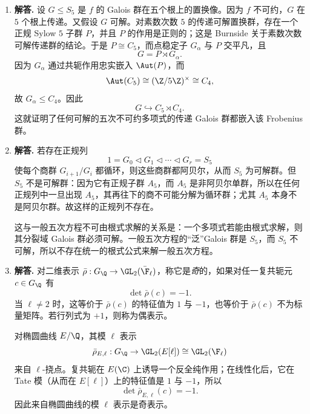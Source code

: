 \begin{enumerate}[label=\textbf{\arabic*.}, leftmargin=*, itemsep=1em]
\item \textbf{解答.} 设 $G\le S_5$ 是 $f$ 的 Galois 群在五个根上的置换像。因为 $f$ 不可约，$G$ 在 $5$ 个根上传递。又假设 $G$ 可解。对素数次数 $5$ 的传递可解置换群，存在一个正规 Sylow $5$ 子群 $P$，并且 $P$ 的作用是正则的；这是 Burnside 关于素数次数可解传递群的结论。于是 $P\cong C_5$，而点稳定子 $G_\alpha$ 与 $P$ 交平凡，且
\[
G=P\rtimes G_\alpha.
\]
因为 $G_\alpha$ 通过共轭作用忠实嵌入 $\Aut(P)$，而
\[
\Aut(C_5)\cong (\Z/5\Z)^\times\cong C_4,
\]
故 $G_\alpha\le C_4$。因此
\[
G\hookrightarrow C_5\rtimes C_4.
\]
这就证明了任何可解的五次不可约多项式的传递 Galois 群都嵌入该 Frobenius 群。

\item \textbf{解答.} 若存在正规列
\[
1=G_0\triangleleft G_1\triangleleft\cdots\triangleleft G_r=S_5
\]
使每个商群 $G_{i+1}/G_i$ 都循环，则这些商群都阿贝尔，从而 $S_5$ 为可解群。但 $S_5$ 不是可解群：因为它有正规子群 $A_5$，而 $A_5$ 是非阿贝尔单群，所以在任何正规列中一旦出现 $A_5$，其再往下的商不可能分解为循环群；尤其 $A_5$ 本身不是阿贝尔群。故这样的正规列不存在。

这与一般五次方程不可由根式求解的关系是：一个多项式若能由根式求解，则其分裂域 Galois 群必须可解。一般五次方程的“泛”Galois 群是 $S_5$，而 $S_5$ 不可解，所以不存在统一的根式公式来解一般五次方程。

\item \textbf{解答.} 对二维表示 $\bar\rho:G_{\Q}\to\GL_2(\bar\F_\ell)$，称它是\emph{奇}的，如果对任一复共轭元 $c\in G_{\Q}$ 有
\[
\det\bar\rho(c)=-1.
\]
当 $\ell\neq2$ 时，这等价于 $\bar\rho(c)$ 的特征值为 $1$ 与 $-1$，也等价于 $\bar\rho(c)$ 不为标量矩阵。若行列式为 $+1$，则称为偶表示。

对椭圆曲线 $E/\Q$，其模 $\ell$ 表示
\[
\bar\rho_{E,\ell}:G_{\Q}\to\GL_2(E[\ell])\cong\GL_2(\F_\ell)
\]
来自 $\ell$-挠点。复共轭在 $E(\C)$ 上诱导一个反全纯作用；在线性化后，它在 Tate 模（从而在 $E[\ell]$）上的特征值是 $1$ 与 $-1$，所以
\[
\det\bar\rho_{E,\ell}(c)=-1.
\]
因此来自椭圆曲线的模 $\ell$ 表示是奇表示。
\end{enumerate}

